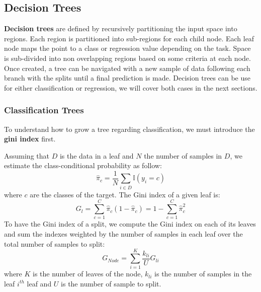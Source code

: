 \documentclass[12pt]{report}
\begin{document}
        \subsection{Decision Trees}
            \textbf{Decision trees} are defined by recursively partitioning the input space into regions. Each region is partitioned into sub-regions for each child node.
            Each leaf node maps the point to a class or regression value depending on the task. Space is sub-divided into non overlapping regions based on some criteria at each node. Once created, a tree can be navigated with a new sample of data following each branch with the splits until a final prediction is made. Decision trees can be use for either classification or regression, we will cover both cases in the next sections.
            
            \subsubsection{Classification Trees}
                To understand how to grow a tree regarding classification, we must introduce the \textbf{gini index} first.
                
                Assuming that $D$ is the data in a leaf and $N$ the number of samples in $D$, we estimate the class-conditional probability as follow:
                \begin{equation}
                    \hat{\pi}_c = \frac{1}{N} \sum_{i \in D}\mathbb{I}(y_i = c)
                \end{equation}
                where $c$ are the classes of the target. The Gini index of a given leaf is:
                \begin{equation}
                    G_{l} = \sum_{c=1}^{C}\hat{\pi}_c(1 -\hat{\pi}_c) = 1 - \sum_{c=1}^{C}\hat{\pi}^2_c
                \end{equation}
                To have the Gini index of a split, we compute the Gini index on each of its leaves and sum the indexes weighted by the number of samples in each leaf over the total number of samples to split:
                \begin{equation}
                    G_{Node} = \sum_{i=1}^{K} \frac{k_{li}}{U}G_{li}
                \end{equation}
                where $K$ is the number of leaves of the node, $k_{li}$ is the number of samples in the leaf $i^{th}$ leaf and $U$ is the number of sample to split.
                
\end{document}
